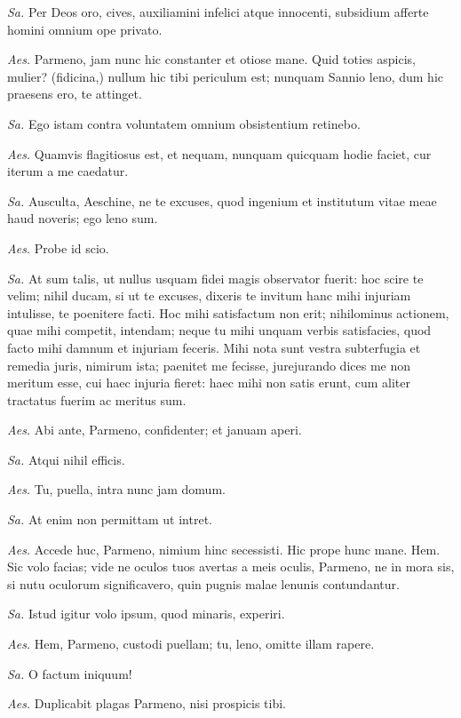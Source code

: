 {
\setlength{\parindent}{0pt}

\textit{Sa.} Per Deos oro, cives, auxiliamini infelici atque innocenti, subsidium afferte homini omnium ope privato. 

\textit{Aes.} Parmeno, jam nunc hic constanter et otiose mane. Quid toties aspicis, mulier? (fidicina,) nullum hic tibi periculum est; nunquam Sannio leno, dum hic praesens ero, te attinget. 

\textit{Sa.} Ego istam contra voluntatem omnium obsistentium retinebo. 

\textit{Aes.} Quamvis flagitiosus est, et nequam, nunquam quicquam hodie faciet, cur iterum a me caedatur. 

\textit{Sa.} Ausculta, Aeschine, ne te excuses, quod ingenium et institutum vitae meae haud noveris; ego leno sum.

\textit{Aes.} Probe id scio. 

\textit{Sa.} At sum talis, ut nullus usquam fidei magis observator fuerit: hoc scire te velim; nihil ducam, si ut te excuses, dixeris te invitum hanc mihi injuriam intulisse, te poenitere facti. Hoc mihi satisfactum non erit; nihilominus actionem, quae mihi competit, intendam; neque tu mihi unquam verbis satisfacies, quod facto mihi damnum et injuriam feceris. Mihi nota sunt vestra subterfugia et remedia juris, nimirum ista; paenitet me fecisse, jurejurando dices me non meritum esse, cui haec injuria fieret: haec mihi non satis erunt, cum aliter tractatus fuerim ac meritus sum. 

\textit{Aes.} Abi ante, Parmeno, confidenter; et januam aperi. 

\textit{Sa.} Atqui nihil efficis. 

\textit{Aes.} Tu, puella, intra nunc jam domum. 

\textit{Sa.} At enim non permittam ut intret. 

\textit{Aes.} Accede huc, Parmeno, nimium hinc secessisti. Hic prope hunc mane. Hem. Sic volo facias; vide ne oculos tuos avertas a meis oculis, Parmeno, ne in mora sis, si nutu oculorum significavero, quin pugnis malae lenunis contundantur. 

\textit{Sa.} Istud igitur volo ipsum, quod minaris, experiri.

\textit{Aes.} Hem, Parmeno, custodi puellam; tu, leno, omitte illam rapere. 

\textit{Sa.} O factum iniquum! 

\textit{Aes.} Duplicabit plagas Parmeno, nisi prospicis tibi. 

}
